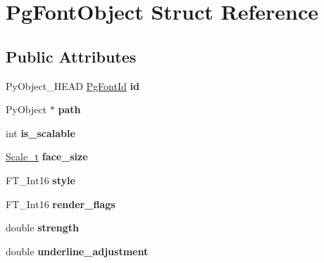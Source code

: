 \hypertarget{struct_pg_font_object}{}\section{Pg\+Font\+Object Struct Reference}
\label{struct_pg_font_object}
\subsection*{Public Attributes}
\begin{DoxyCompactItemize}
\item 
\mbox{\label{struct_pg_font_object_aa352fb7686cb294e0c075b5a300fab53}} 
Py\+Object\+\_\+\+H\+E\+AD \hyperlink{struct_pg_font_id}{Pg\+Font\+Id} {\bfseries id}
\item 
\mbox{\label{struct_pg_font_object_af2ac6f3d11e788d20426b974d3dc4ec1}} 
Py\+Object $\ast$ {\bfseries path}
\item 
\mbox{\label{struct_pg_font_object_a06a0f4962fa36ec43ddfcb3e92b7066f}} 
int {\bfseries is\+\_\+scalable}
\item 
\mbox{\label{struct_pg_font_object_ab54bbfff8930dca1dcad5a14b083aa7a}} 
\hyperlink{struct__scale__s}{Scale\+\_\+t} {\bfseries face\+\_\+size}
\item 
\mbox{\label{struct_pg_font_object_af1d7153d6f1d686efd89ecc5a52a15e9}} 
F\+T\+\_\+\+Int16 {\bfseries style}
\item 
\mbox{\label{struct_pg_font_object_ad607ec568d5fdf5d957dfb8c1f8ae533}} 
F\+T\+\_\+\+Int16 {\bfseries render\+\_\+flags}
\item 
\mbox{\label{struct_pg_font_object_a0959e9518daaa07b48c30d8848c62ac6}} 
double {\bfseries strength}
\item 
\mbox{\label{struct_pg_font_object_a00aa2bbe97e99783ca2def8287440dbf}} 
double {\bfseries underline\+\_\+adjustment}
\item 
\mbox{\label{struct_pg_font_object_a485b3f6ef5274410c3e2e6796aa26d03}} 

\end{DoxyCompactItemize}
